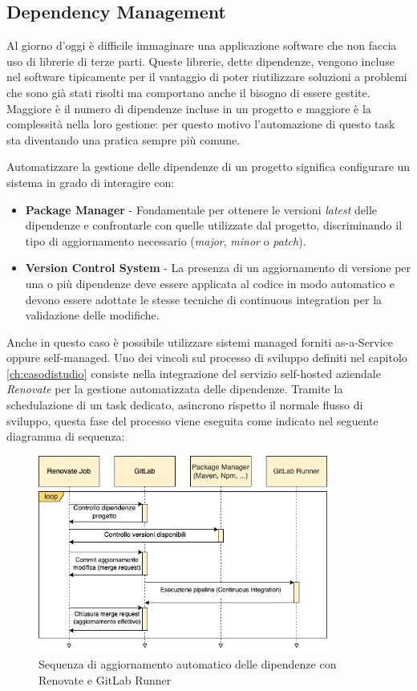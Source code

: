 \subsection{Dependency Management}
Al giorno d'oggi è difficile immaginare una applicazione software che non faccia uso di librerie di terze parti. Queste librerie, dette dipendenze, vengono incluse nel software tipicamente per il vantaggio di poter riutilizzare soluzioni a problemi che sono già stati risolti ma comportano anche il bisogno di essere gestite. Maggiore è il numero di dipendenze incluse in un progetto e maggiore è la complessità nella loro gestione: per questo motivo l’automazione di questo task sta diventando una pratica sempre più comune.

Automatizzare la gestione delle dipendenze di un progetto significa configurare un sistema in grado di interagire con:

\begin{itemize}
    \item \textbf{Package Manager} - Fondamentale per ottenere le versioni \textit{latest} delle dipendenze e confrontarle con quelle utilizzate dal progetto, discriminando il tipo di aggiornamento necessario (\textit{major}, \textit{minor} o \textit{patch}).
    \item \textbf{Version Control System} - La presenza di un aggiornamento di versione per una o più dipendenze deve essere applicata al codice in modo automatico e devono essere adottate le stesse tecniche di continuous integration per la validazione delle modifiche.
\end{itemize}

Anche in questo caso è possibile utilizzare sistemi managed forniti as-a-Service oppure self-managed. Uno dei vincoli sul processo di sviluppo definiti nel capitolo \ref{ch:casodistudio} consiste nella integrazione del servizio self-hosted aziendale \textit{Renovate} per la gestione automatizzata delle dipendenze. Tramite la schedulazione di un task dedicato, asincrono rispetto il normale flusso di sviluppo, questa fase del processo viene eseguita come indicato nel seguente diagramma di sequenza:

\begin{figure}[H]
    \centering
    \includegraphics[width=0.85\textwidth]{img/renovate-uml-sequenza.png}
    \caption{Sequenza di aggiornamento automatico delle dipendenze con Renovate e GitLab Runner}
    \label{renovaflow}
\end{figure}

